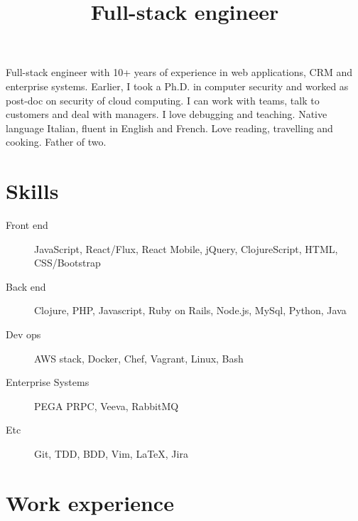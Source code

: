 \documentclass[a4paper,sans,10pt]{moderncv} %
\title{Full-stack engineer}
\newcommand{\experience}{Experience}
\newcommand{\skills}{Computer Skills}
\renewcommand{\experience}{Esperienze di lavoro}
\renewcommand{\skills}{Competenze informatiche}
\renewcommand{\experience}{Work experience}
\renewcommand{\skills}{Skills}
\begin{document}
\maketitle

	\vspace{-1.5em}  %
\justify
Full-stack engineer with 10+ years of experience in web applications, CRM and enterprise systems.
Earlier, I took a Ph.D. in computer security and worked as post-doc on security of cloud computing.
I can work with teams, talk to customers and deal with managers. I love debugging and teaching. Native language Italian, fluent in English and French. Love reading, travelling and cooking.
Father of two.

\section{\skills}
\begin{description}
\item [Front end] JavaScript, React/Flux, React Mobile, jQuery, ClojureScript, HTML, CSS/Bootstrap
\item [Back end] Clojure, PHP, Javascript, Ruby on Rails, Node.js, MySql, Python, Java
\item [Dev ops] AWS stack, Docker, Chef, Vagrant, Linux, Bash
\item [Enterprise Systems] PEGA PRPC, Veeva, RabbitMQ
\item [Etc] Git, TDD, BDD, Vim, \LaTeX, Jira
\end{description}

  \section{\experience}

\renewcommand{\labelitemi}{\tiny$\blacksquare$}
\end{document}

